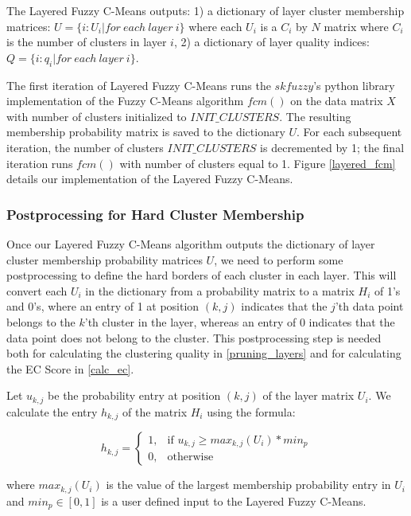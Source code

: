The Layered Fuzzy C-Means outputs: 1) a dictionary of layer cluster membership matrices:  $U = \{i: U_{i} | for\ each\ layer\ i\}$ where each $U_{i}$ is a $C_{i}$ by $N$ matrix where $C_{i}$ is the number of clusters in layer $i$, 2) a dictionary of layer quality indices: $Q = \{i: q_{i} | for\ each\ layer\ i\}$.

The first iteration of Layered Fuzzy C-Means runs the $skfuzzy$'s python library implementation of the Fuzzy C-Means algorithm $fcm()$ \cite{} on the data matrix $X$ with number of clusters initialized to $INIT\_CLUSTERS$. The resulting membership probability matrix is saved to the dictionary $U$. For each subsequent iteration, the number of clusters $INIT\_CLUSTERS$ is decremented by 1; the final iteration runs $fcm()$ with number of clusters equal to 1. Figure \ref{layered_fcm} details our implementation of the Layered Fuzzy C-Means.

\subsubsection{Postprocessing for Hard Cluster Membership}
Once our Layered Fuzzy C-Means algorithm outputs the dictionary of layer cluster membership probability matrices $U$, we need to perform some postprocessing to define the hard borders of each cluster in each layer. This will convert each $U_{i}$ in the dictionary from a probability matrix to a matrix $H_{i}$ of 1's and 0's, where an entry of 1 at position $(k, j)$ indicates that the $j$'th data point belongs to the $k$'th cluster in the layer, whereas an entry of 0 indicates that the data point does not belong to the cluster. This postprocessing step is needed both for calculating the clustering quality in \ref{pruning_layers} and for calculating the EC Score in \ref{calc_ec}.

Let $u_{k,j}$ be the probability entry at position $(k,j)$ of the layer matrix $U_{i}$. We calculate the entry $h_{k,j}$ of the matrix $H_{i}$ using the formula:

\begin{equation}
h_{k,j} = 
\begin{cases}
    1,& \text{if } u_{k,j}\geq max_{k,j}(U_{i}) * min_p\\
    0,              & \text{otherwise}
\end{cases}
\end{equation}

where $max_{k,j}(U_{i})$ is the value of the largest membership probability entry in $U_{i}$ and $min_p \in [0,1]$ is a user defined input to the Layered Fuzzy C-Means.


